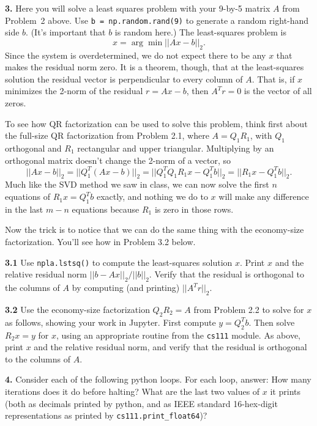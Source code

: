 \documentclass[11pt]{article}
\begin{document}
\par\bigskip
{\bf 3.}
Here you will solve a least squares problem with your 9-by-5 matrix $A$ 
from Problem~2 above.
Use {\tt b = np.random.rand(9)} to generate a random right-hand side $b$. 
(It's important that $b$ is random here.)
The least-squares problem is
$$x = \arg\min||Ax-b||_2.$$
Since the system is overdetermined, 
we do not expect there to be any $x$ that makes the residual norm zero.
It is a theorem, though, that at the least-squares solution the residual vector
is perpendicular to every column of $A$. 
That is, if $x$ minimizes the 2-norm of the residual
$r = Ax-b$, then $A^Tr=0$ is the vector of all zeros.

To see how QR factorization can be used to solve this problem, 
think first about the full-size QR factorization from Problem 2.1, 
where $A = Q_1R_1$, with $Q_1$ orthogonal and $R_1$ rectangular and upper triangular.
Multiplying by an orthogonal matrix doesn't change the 2-norm of a vector, so
$$||Ax-b||_2 = ||Q_1^T(Ax-b)||_2 = ||Q_1^TQ_1R_1x - Q_1^Tb||_2 = ||R_1x - Q_1^Tb||_2.$$
Much like the SVD method we saw in class, we can now solve the first $n$ equations of
$R_1x=Q_1^Tb$ exactly, and nothing we do to $x$ will make any difference in the last
$m-n$ equations because $R_1$ is zero in those rows.

Now the trick is to notice that we can do the same thing with the economy-size factorization.
You'll see how in Problem 3.2 below.

\par\medskip
{\bf 3.1}
Use {\tt npla.lstsq()} to compute the least-squares solution $x$. 
Print $x$ and the relative residual norm $||b-Ax||_2/||b||_2$.
Verify that the residual is orthogonal to the columns of $A$ by 
computing (and printing) $||A^Tr||_2$.

\par\medskip
{\bf 3.2}
Use the economy-size factorization $Q_2R_2=A$ from Problem 2.2 to solve for $x$ 
as follows, showing your work in Jupyter.
First compute $y = Q_2^Tb$. 
Then solve $R_2x=y$ for $x$, using an appropriate routine from the {\tt cs111} module.
As above, print $x$ and the relative residual norm, 
and verify that the residual is orthogonal to the columns of $A$.

\par\bigskip
{\bf 4.}
Consider each of the following python loops.
For each loop, answer:
How many iterations does it do before halting?
What are the last two values of $x$ it prints
(both as decimals printed by python, and as
IEEE standard 16-hex-digit representations
as printed by {\tt cs111.print\_float64})?
\end{document}
